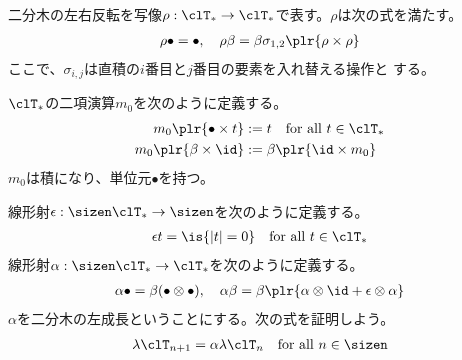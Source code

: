 {	二分木の左右反転を写像$\rho:\clT_*\to\clT_*$で表す。$\rho$は次の式を満たす。
	\begin{equation*}\begin{split}
		\rho\bullet = \bullet,\quad \rho\beta = \beta\sigma_{1,2}\plr{\rho\times\rho}
	\end{split}\end{equation*}
	ここで、$\sigma_{i,j}$は直積の$i$番目と$j$番目の要素を入れ替える操作と
	する。

	$\clT_*$の二項演算$m_0$を次のように定義する。
	\begin{equation*}\begin{split}
		m_0\plr{\bullet\times t} &:= t \quad\text{for all } t\in\clT_* \\
		m_0\plr{\beta\times\id} &:= \beta\plr{\id\times m_0}
	\end{split}\end{equation*}
	$m_0$は積になり、単位元$\bullet$を持つ。

	線形射$\epsilon:\sizen\clT_*\to\sizen$を次のように定義する。
	\begin{equation*}\begin{split}
		\epsilon t = \is{|t|=0} \quad\text{for all } t\in\clT_*
	\end{split}\end{equation*}
	線形射$\alpha:\sizen\clT_*\to\clT_*$を次のように定義する。
	\begin{equation*}\begin{split}
		\alpha\bullet = \beta(\bullet\otimes\bullet),\quad 
		\alpha\beta = \beta\plr{\alpha\otimes\id + \epsilon\otimes\alpha}
	\end{split}\end{equation*}
	$\alpha$を二分木の左成長ということにする。次の式を証明しよう。
	\begin{equation}\label{eq:左成長は列挙になる}\begin{split}
		\lambda\clT_{n+1}=\alpha\lambda\clT_n \quad\text{for all } n\in\sizen
	\end{split}\end{equation}

}
